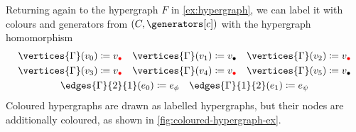 \begin{example}\label{ex:coloured-hypergraph}
    Returning again to the hypergraph \(F\) in \cref{ex:hypergraph}, we can
    label it with colours and generators from \((C,\generators[c])\) with
    the hypergraph homomorphism
    \begin{gather*}
        \vertices{\Gamma}(v_0) \coloneqq v_{\redbullet}
        \quad
        \vertices{\Gamma}(v_1) \coloneqq v_{\bullet}
        \quad
        \vertices{\Gamma}(v_2) \coloneqq v_{\redbullet}
        \\
        \vertices{\Gamma}(v_3) \coloneqq v_{\redbullet}
        \quad
        \vertices{\Gamma}(v_4) \coloneqq v_{\redbullet}
        \quad
        \vertices{\Gamma}(v_5) \coloneqq v_{\bullet}
        \\
        \edges{\Gamma}{2}{1}(e_0) \coloneqq e_{\phi}
        \quad
        \edges{\Gamma}{1}{2}(e_1) \coloneqq e_{\psi}
    \end{gather*}
    Coloured hypergraphs are drawn as labelled hypergraphs, but their nodes
    are additionally coloured, as shown in \cref{fig:coloured-hypergraph-ex}.
\end{example}